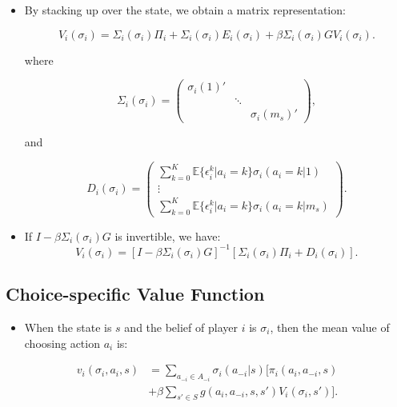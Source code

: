 \documentclass[]{book}
\providecommand{\tightlist}{%
  \setlength{\itemsep}{0pt}\setlength{\parskip}{0pt}}
\begin{document}
\begin{itemize}
\tightlist
\item
  By stacking up over the state, we obtain a matrix representation:

  \begin{equation}
  V_i(\sigma_i) = \Sigma_i(\sigma_i) \Pi_i + \Sigma_i(\sigma_i) E_i(\sigma_i) + \beta \Sigma_i(\sigma_i) G V_i(\sigma_i).
  \end{equation}

  where

  \begin{equation}
  \Sigma_i(\sigma_i) = 
  \begin{pmatrix}
  \sigma_i(1)' & & \\
  & \ddots & \\
  & & \sigma_i(m_s)'
  \end{pmatrix},
  \end{equation}

  and

  \begin{equation}
  D_i(\sigma_i) =
  \begin{pmatrix}
  \sum_{k = 0}^K \mathbb{E}\{\epsilon_i^k|a_i = k\}\sigma_i(a_i = k|1)\\
  \vdots\\
  \sum_{k = 0}^K \mathbb{E}\{\epsilon_i^k|a_i = k\}\sigma_i(a_i = k|m_s)
  \end{pmatrix}.
  \end{equation}
\item
  If \(I - \beta \Sigma_i(\sigma_i)G\) is invertible, we have: \[
  V_i(\sigma_i) = [I - \beta \Sigma_i(\sigma_i)G]^{-1}[\Sigma_i(\sigma_i)\Pi_i + D_i(\sigma_i)].
  \]
\end{itemize}

\subsection{Choice-specific Value
Function}\label{choice-specific-value-function-1}

\begin{itemize}
\tightlist
\item
  When the state is \(s\) and the belief of player \(i\) is
  \(\sigma_i\), then the mean value of choosing action \(a_i\) is:
\end{itemize}

\begin{equation}
\begin{split}
v_i(\sigma_i, a_i, s) &= \sum_{a_{-i} \in A_{-i}} \sigma_i(a_{-i}|s)[ \pi_i(a_i, a_{-i}, s) \\
&+ \beta \sum_{s' \in S} g(a_i, a_{-i}, s, s') V_i(\sigma_i, s')].
\end{split}
\end{equation}
\end{document}
